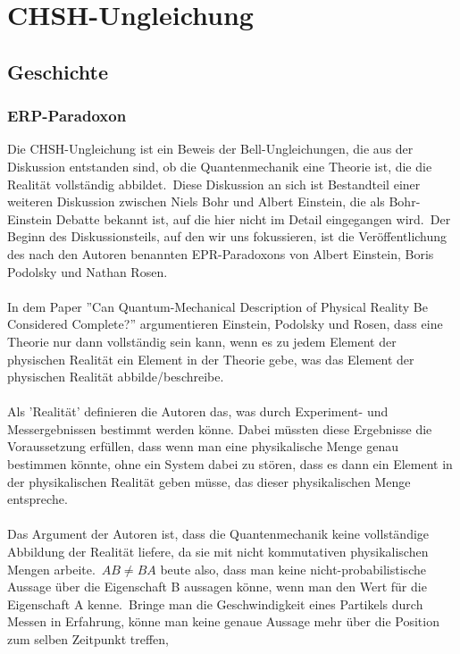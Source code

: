\section{CHSH-Ungleichung}
\label{sec:chsh}


\subsection{Geschichte}
\label{subsec:chsh_geschichte}
\subsubsection{ERP-Paradoxon}
\label{subsubsec:erp_paradoxon}
Die CHSH-Ungleichung ist ein Beweis der Bell-Ungleichungen, die aus der Diskussion entstanden sind, ob die Quantenmechanik eine Theorie ist,
die die Realität vollständig abbildet.\ Diese Diskussion an sich ist Bestandteil einer weiteren Diskussion zwischen Niels Bohr und Albert Einstein,
die als Bohr-Einstein Debatte bekannt ist, auf die hier nicht im Detail eingegangen wird.\ Der Beginn des Diskussionsteils, auf den wir uns fokussieren,
ist die Veröffentlichung des nach den Autoren benannten EPR-Paradoxons von Albert Einstein, Boris Podolsky und Nathan Rosen.\\\\
In dem Paper ''Can Quantum-Mechanical Description of Physical Reality Be Considered Complete?'' argumentieren Einstein, Podolsky und Rosen, dass
eine Theorie nur dann vollständig sein kann, wenn es zu jedem Element der physischen Realität ein Element in der Theorie gebe, was das Element
der physischen Realität abbilde/beschreibe.\\\\ Als 'Realität' definieren die Autoren das, was durch Experiment- und Messergebnissen bestimmt werden könne.
Dabei müssten diese Ergebnisse die Voraussetzung erfüllen, dass wenn man eine physikalische Menge genau bestimmen könnte, ohne ein System dabei zu stören,
dass es dann ein Element in der physikalischen Realität geben müsse, das dieser physikalischen Menge entspreche.\\\\
Das Argument der Autoren ist, dass die Quantenmechanik keine vollständige Abbildung der Realität liefere, da sie mit nicht kommutativen physikalischen Mengen arbeite.\
$AB \neq BA$ beute also, dass man keine nicht-probabilistische Aussage über die Eigenschaft B aussagen könne, wenn man den Wert für die Eigenschaft A kenne.\ Bringe man die Geschwindigkeit eines Partikels durch Messen in Erfahrung, könne man keine genaue Aussage mehr über die Position zum selben Zeitpunkt treffen,
